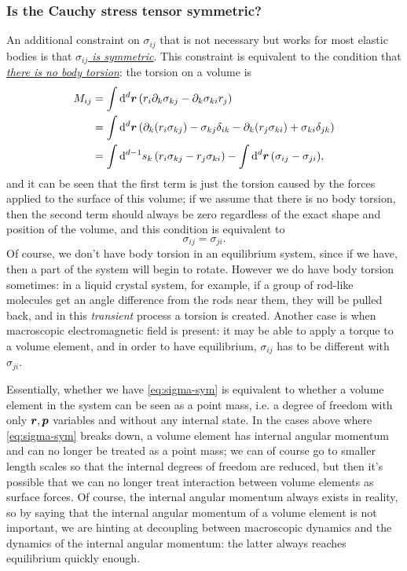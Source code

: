 \documentclass[hyperref, a4paper]{article}
\begin{document}
\subsubsection{Is the Cauchy stress tensor symmetric?}

An additional constraint on $\sigma_{ij}$ that is not necessary 
but works for most elastic bodies is that 
\ul{\emph{$\sigma_{ij}$ is symmetric}}.
This constraint is equivalent to the condition 
that \ul{\emph{there is no body torsion}}:
the torsion on a volume is 
\begin{equation}
    \begin{aligned}
        M_{ij} &= \int \dd[d]{\vb*{r}} 
        \left(
            r_i \partial_k \sigma_{kj} - \partial_k \sigma_{ki} r_j
        \right) \\
        &= \int \dd[d]{\vb*{r}} \left(
            \partial_k(r_i \sigma_{kj}) - \sigma_{kj} \delta_{ik}
            - \partial_k (r_j \sigma_{ki}) + \sigma_{ki} \delta_{jk}
        \right) \\
        &= \int \dd[d-1]{s_k} (r_i \sigma_{kj} - r_j \sigma_{ki})
        - \int \dd[d]{\vb*{r}} (\sigma_{ij} - \sigma_{ji}),
    \end{aligned}
\end{equation}
and it can be seen that the first term is just the torsion caused 
by the forces applied to the surface of this volume;
if we assume that there is no body torsion,
then the second term should always be zero regardless 
of the exact shape and position of the volume,
and this condition is equivalent to 
\begin{equation}
    \sigma_{ij} = \sigma_{ji}.
    \label{eq:sigma-sym}
\end{equation}
Of course, we don't have body torsion in an equilibrium system,
since if we have, 
then a part of the system will begin to rotate.
However we do have body torsion sometimes: 
in a liquid crystal system, for example, 
if a group of rod-like molecules get an angle difference 
from the rods near them,
they will be pulled back, 
and in this \emph{transient} process a torsion is created.
Another case is when macroscopic electromagnetic field is present: 
it may be able to apply a torque to a volume element, 
and in order to have equilibrium, 
$\sigma_{ij}$ has to be different with $\sigma_{ji}$.

Essentially, whether we have \eqref{eq:sigma-sym} 
is equivalent to whether a volume element in the system 
can be seen as a point mass, 
i.e. a degree of freedom with only $\vb*{r}, \vb*{p}$ variables 
and without any internal state.
In the cases above where \eqref{eq:sigma-sym} breaks down, 
a volume element has internal angular momentum and 
can no longer be treated as a point mass; 
we can of course go to smaller length scales 
so that the internal degrees of freedom are reduced, 
but then it's possible that we can no longer treat 
interaction between volume elements as surface forces. 
Of course, the internal angular momentum always exists in reality,
so by saying that the internal angular momentum of a volume element is not important,
we are hinting at decoupling between 
macroscopic dynamics and the dynamics of the internal angular momentum:
the latter always reaches equilibrium quickly enough.
\end{document}
